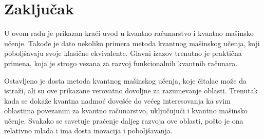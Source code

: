 \documentclass[12pt, letterpaper, oneside]{article}
\begin{document}
\section{Zaključak}
U ovom radu je prikazan kraći uvod u kvantno računarstvo i kvantno mašinsko učenje. Takođe je dato nekoliko primera metoda kvantnog mašinskog učenja, 
koji poboljšavaju svoje klasične ekvivalente. Glavni izazov trenutno je praktična primena, koja je strogo vezana za razvoj funkcionalnih kvantnih računara.

Ostavljeno je dosta metoda kvantnog mašinskog učenja, koje čitalac može da istraži, ali su ove prikazane verovatno dovoljne za razumevanje oblasti.
Trenutak kada se dokaže kvantna nadmoć dovešće do većeg interesovanja ka svim oblastima povezanim za kvantno računarstvo, 
uključujući i kvantno mašinsko učenje. Svakako se savetuje praćenje daljeg razvoja ove oblasti, pošto je ona relativno mlada
i ima dosta inovacija i poboljšavanja.


\newpage

\printbibliography
\end{document}
